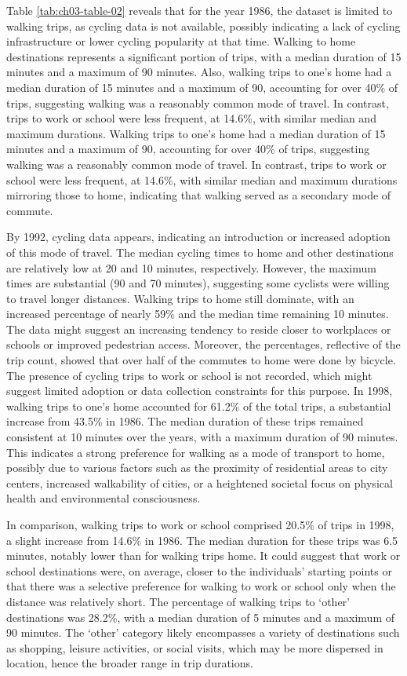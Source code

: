 \documentclass[
11pt, %
oneside, %
english, %
singlespacing, %
]{macthesis} %
\begin{document}
Table \ref{tab:ch03-table-02} reveals that for the year 1986, the dataset is limited to walking trips, as cycling data is not available, possibly indicating a lack of cycling infrastructure or lower cycling popularity at that time. Walking to home destinations represents a significant portion of trips, with a median duration of 15 minutes and a maximum of 90 minutes. Also, walking trips to one's home had a median duration of 15 minutes and a maximum of 90, accounting for over 40\% of trips, suggesting walking was a reasonably common mode of travel. In contrast, trips to work or school were less frequent, at 14.6\%, with similar median and maximum durations. Walking trips to one's home had a median duration of 15 minutes and a maximum of 90, accounting for over 40\% of trips, suggesting walking was a reasonably common mode of travel. In contrast, trips to work or school were less frequent, at 14.6\%, with similar median and maximum durations mirroring those to home, indicating that walking served as a secondary mode of commute.

By 1992, cycling data appears, indicating an introduction or increased adoption of this mode of travel. The median cycling times to home and other destinations are relatively low at 20 and 10 minutes, respectively. However, the maximum times are substantial (90 and 70 minutes), suggesting some cyclists were willing to travel longer distances. Walking trips to home still dominate, with an increased percentage of nearly 59\% and the median time remaining 10 minutes. The data might suggest an increasing tendency to reside closer to workplaces or schools or improved pedestrian access. Moreover, the percentages, reflective of the trip count, showed that over half of the commutes to home were done by bicycle. The presence of cycling trips to work or school is not recorded, which might suggest limited adoption or data collection constraints for this purpose. In 1998, walking trips to one's home accounted for 61.2\% of the total trips, a substantial increase from 43.5\% in 1986. The median duration of these trips remained consistent at 10 minutes over the years, with a maximum duration of 90 minutes. This indicates a strong preference for walking as a mode of transport to home, possibly due to various factors such as the proximity of residential areas to city centers, increased walkability of cities, or a heightened societal focus on physical health and environmental consciousness.

In comparison, walking trips to work or school comprised 20.5\% of trips in 1998, a slight increase from 14.6\% in 1986. The median duration for these trips was 6.5 minutes, notably lower than for walking trips home. It could suggest that work or school destinations were, on average, closer to the individuals' starting points or that there was a selective preference for walking to work or school only when the distance was relatively short. The percentage of walking trips to `other' destinations was 28.2\%, with a median duration of 5 minutes and a maximum of 90 minutes. The `other' category likely encompasses a variety of destinations such as shopping, leisure activities, or social visits, which may be more dispersed in location, hence the broader range in trip durations.
\end{document}
